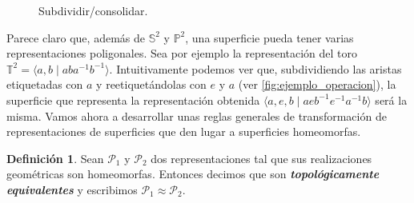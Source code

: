 \documentclass[10pt]{report}
\newcommand{\Esfera}{\mathbb{S}^2}
\newcommand{\Toro}{\mathbb{T}^2}
\newcommand{\Proyectivo}{\mathbb{P}^2}
\newcommand{\enfatiza}[1]{\textbf{\textit{#1}}}
\theoremstyle{definition}
\newtheorem{defin}{Definición}[section]
\begin{document}
\begin{figure}[]%
\centering
{}

\caption{Subdividir/consolidar. \label{fig:ejemplo_operacion}}
\end{figure}


Parece claro que, además de $\Esfera$ y $\Proyectivo$, una superficie pueda tener varias representaciones poligonales. Sea por ejemplo la representación del toro $\Toro=\langle a,b\mid aba^{-1}b^{-1}\rangle$. Intuitivamente podemos ver que, subdividiendo las aristas etiquetadas con $a$ y reetiquetándolas con $e$ y $a$ (ver \autoref{fig:ejemplo_operacion}), la superficie que representa la representación obtenida $\langle a,e,b\mid  aeb^{-1}e^{-1}a^{-1}b\rangle$ será la misma.
Vamos ahora a desarrollar unas reglas generales de transformación de representaciones de superficies que den lugar a superficies homeomorfas.



\begin{defin}%
Sean $\mathcal{P}_1$ y $\mathcal{P}_2$ dos representaciones tal que sus realizaciones geométricas son homeomorfas. Entonces decimos que son \enfatiza{topológicamente equivalentes} y escribimos $\mathcal{P}_1 \approx \mathcal{P}_2$.
\end{defin}
\end{document}
